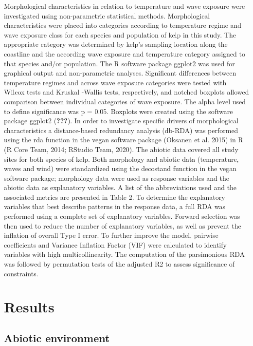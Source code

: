 \documentclass[
  a4paper,
]{article}
\begin{document}
Morphological characteristics in relation to temperature and wave
exposure were investigated using non-parametric statistical methods.
Morphological characteristics were placed into categories according to
temperature regime and wave exposure class for each species and
population of kelp in this study. The appropriate category was
determined by kelp's sampling location along the coastline and the
according wave exposure and temperature category assigned to that
species and/or population. The R software package ggplot2 was used for
graphical output and non-parametric analyses. Significant differences
between temperature regimes and across wave exposure categories were
tested with Wilcox tests and Kruskal -Wallis tests, respectively, and
notched boxplots allowed comparison between individual categories of
wave exposure. The alpha level used to define significance was p = 0.05.
Boxplots were created using the software package ggplot2
({\textbf{???}}). In order to investigate specific drivers of
morphological characteristics a distance-based redundancy analysis
(db-RDA) was performed using the rda function in the vegan software
package (Oksanen et al. 2015) in R (R Core Team, 2014; RStudio Team,
2020). The abiotic data covered all study sites for both species of
kelp. Both morphology and abiotic data (temperature, waves and wind)
were standardized using the decostand function in the vegan software
package; morphology data were used as response variables and the abiotic
data as explanatory variables. A list of the abbreviations used and the
associated metrics are presented in Table 2. To determine the
explanatory variables that best describe patterns in the response data,
a full RDA was performed using a complete set of explanatory variables.
Forward selection was then used to reduce the number of explanatory
variables, as well as prevent the inflation of overall Type I error. To
further improve the model, pairwise coefficients and Variance Inflation
Factor (VIF) were calculated to identify variables with high
multicollinearity. The computation of the parsimonious RDA was followed
by permutation tests of the adjusted R2 to assess significance of
constraints.

\hypertarget{results}{%
\section{Results}\label{results}}

\hypertarget{abiotic-environment-1}{%
\subsection{Abiotic environment}\label{abiotic-environment-1}}
\end{document}
